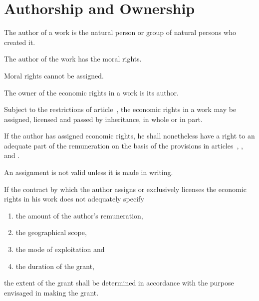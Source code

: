 \section{Authorship and Ownership}
\begin{contract}

\label{Par:Authorship}
\Sentence The author of a work is the natural person or group of natural persons who
created it.

\label{Par:MoralRights}
\Sentence The author of the work has the moral rights.

\Sentence Moral rights cannot be assigned.

\label{Par:EconomicRights}
\Sentence The owner of the economic rights in a work is its author.

\Sentence  Subject to the restrictions of article~, the economic rights in a work may
be assigned, licensed and passed by inheritance, in whole or in part.

\Sentence If the author has assigned economic rights, he shall nonetheless have
a right to an adequate part of the remuneration on the basis of the
provisions in articles~, ,  and .

\Sentence An assignment is not valid unless it is made in writing.

\label{Par:Limits}
\Sentence If the contract by which the author assigns or exclusively licenses the
economic rights in his work does not adequately specify 
\begin{enumerate}[nolistsep,label=\alph*.,labelindent=1em,labelsep=*,align=left,beginpenalty=10000,endpenalty=10000]
	\item the amount of the author's remuneration, 
	\item the geographical scope, 
	\item the mode of exploitation and 
	\item the duration of the grant, 
\end{enumerate}
the extent of the grant shall be determined
in accordance with the purpose envisaged in making the grant.


\end{contract}
